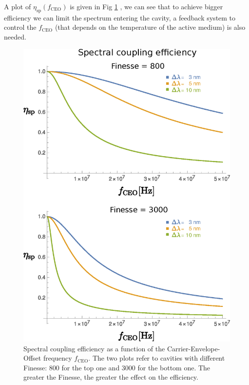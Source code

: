 A plot of $\eta_\mathrm{sp}(f_\mathrm{CEO})$ is given in Fig \ref{fig:spectraleta} , we can see that to achieve bigger efficiency we can limit the spectrum entering the cavity, a feedback system to control the $f_\mathrm{CEO}$ (that depends on the temperature of the active medium) is also needed.
\begin{figure}
	\centering
	\includegraphics[width=0.9\linewidth]{images/spectraleta.eps}
	\caption{Spectral coupling efficiency as a function of the Carrier-Envelope-Offset frequency $f_\mathrm{CEO}$. The two plots refer to cavities with different Finesse: 800 for the top one and 3000 for the bottom one. The greater the Finesse, the greater the effect on the efficiency.}
	\label{fig:spectraleta}
\end{figure}

